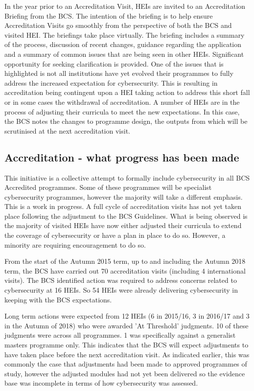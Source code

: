\documentclass[conference]{IEEEtran}
\begin{document}
In the year prior to an Accreditation Visit, HEIs are invited to an Accreditation Briefing from the BCS. The intention of the briefing is to help ensure Accreditation Visits go smoothly from the perspective of both the BCS and visited HEI. The briefings take place virtually. The briefing includes a summary of the process, discussion of recent changes, guidance regarding the application and a summary of common issues that are being seen in other HEIs. Significant opportunity for seeking clarification is provided. One of the issues that is highlighted is not all institutions have yet evolved their programmes to fully address the increased expectation for cybersecurity. This is resulting in accreditation being contingent upon a HEI taking action to address this short fall or in some cases the withdrawal of accreditation. A number of HEIs are in the process of adjusting their curricula to meet the new expectations. In this case, the BCS notes the changes to programme design, the outputs from which will be scrutinised at the next accreditation visit.

\subsection{Accreditation - what progress has been made}

This initiative is a collective attempt to formally include cybersecurity in all BCS Accredited programmes. Some of these programmes will be specialist cybersecurity programmes, however the majority will take a different emphasis. This is a work in progress. A full cycle of accreditation visits has not yet taken place following the adjustment to the BCS Guidelines. What is being observed is the majority of visited HEIs have now either adjusted their curricula to extend the coverage of cybersecurity or have a plan in place to do so. However, a minority are requiring encouragement to do so.

From the start of the Autumn 2015 term, up to and including the Autumn 2018 term, the BCS have carried out 70 accreditation visits (including 4 international visits). The BCS identified action was required to address concerns related to cybersecurity at 16 HEIs. So 54 HEIs were already delivering cybersecurity in keeping with the BCS expectations.

Long term actions were expected from 12 HEIs (6 in 2015/16, 3 in 2016/17 and 3 in the Autumn of 2018) who were awarded 'At Threshold' judgments. 10 of these judgments were across all programmes. 1 was specifically against a generalist masters programme only. This indicates that the BCS will expect adjustments to have taken place before the next accreditation visit. As indicated earlier, this was commonly the case that adjustments had been made to approved programmes of study, however the adjusted modules had not yet been delivered so the evidence base was incomplete in terms of how cybersecurity was assessed.
 
\end{document}
